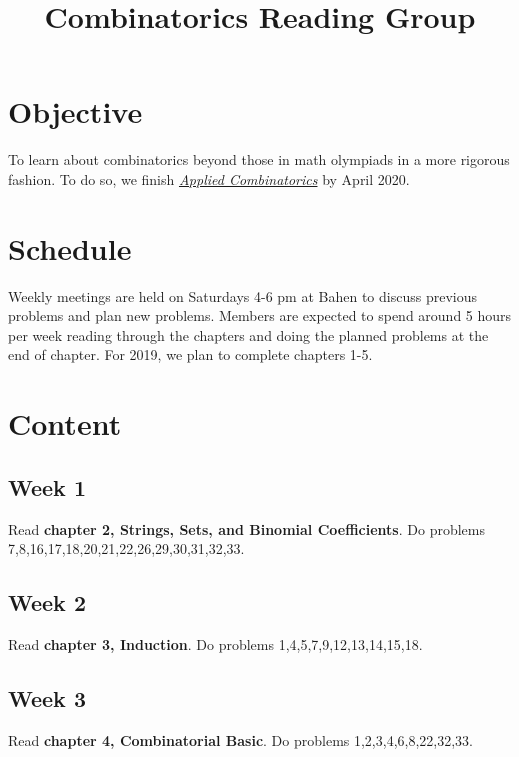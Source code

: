 \documentclass[12pt]{article}
\begin{document}
	
	
\title{Combinatorics Reading Group}
\maketitle
	
\section{Objective}
To learn about combinatorics beyond those in math olympiads in a more rigorous fashion. To do so, we finish \textit{\href{https://open.umn.edu/opentextbooks/textbooks/applied-combinatorics}{Applied Combinatorics}} by April 2020.

\section{Schedule}
Weekly meetings are held on Saturdays 4-6 pm at Bahen to discuss previous problems and plan new problems. Members are expected to spend around 5 hours per week reading through the chapters and doing the planned problems at the end of chapter. For 2019, we plan to complete chapters 1-5.

\section{Content}
	\subsection{Week 1}
	Read \textbf{chapter 2, Strings, Sets, and Binomial Coefficients}. Do problems 7,8,16,17,18,20,21,22,26,29,30,31,32,33.

	\subsection{Week 2}
	Read \textbf{chapter 3, Induction}. Do problems 1,4,5,7,9,12,13,14,15,18.
	
	\subsection{Week 3}
	Read \textbf{chapter 4, Combinatorial Basic}. Do problems 1,2,3,4,6,8,22,32,33.
	
\end{document}
